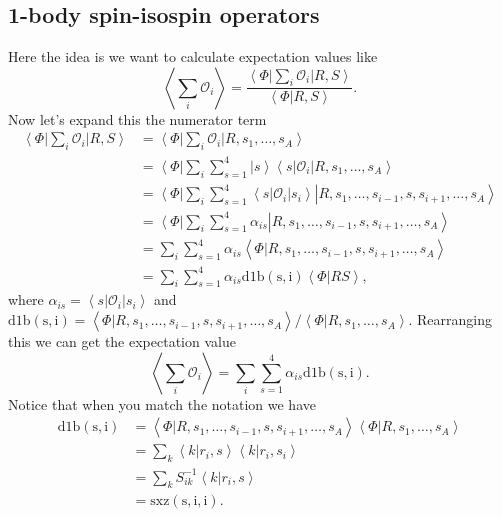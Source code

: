 \documentclass[12pt]{extarticle}
\newcommand{\Oi}{\mathcal{O}_{i}}
\newcommand{\ket}[1]{\left| #1 \right>}
\newcommand{\bra}[1]{\left< #1 \right|}
\newcommand{\braket}[2]{\left< #1 | #2 \right>}
\newcommand{\ketbra}[2]{\left| #1 \right> \left< #2 \right|}
\newcommand{\mycolor}[1]{\textit{\textcolor{red}{#1}}}
\newcommand{\longsi}{s_1, \ldots, s_{i-1} , s, s_{i+1}, \ldots, s_A}
\begin{document}
\subsection{1-body spin-isospin operators}
Here the idea is we want to calculate expectation values like
\begin{equation}
 \left< \sum_i \Oi \right> = \frac{\bra{\Phi} \sum\limits_i \Oi \ket{R,S}}{\braket{\Phi}{R,S}}.
\end{equation}
Now let's expand this the numerator term
\begin{align}
  \bra{\Phi} \sum_i \Oi \ket{R,S} &= \bra{\Phi} \sum_i \Oi \ket{R,s_1,\ldots,s_A} \\
  &= \bra{\Phi} \sum_i\sum_{s=1}^4	\ketbra{s}{s} \Oi \ket{R,s_1,\ldots,s_A} \\
  &= \bra{\Phi} \sum_i\sum_{s=1}^4	\bra{s}\Oi\ket{s_i} \ket{R,\longsi} \\
  &= \bra{\Phi} \sum_i\sum_{s=1}^4 \alpha_{is} \ket{R,\longsi} \\
  &= \sum_i\sum_{s=1}^4 \alpha_{is} \braket{\Phi}{R,\longsi} \\
  &= \sum_i\sum_{s=1}^4 \alpha_{is} \mathrm{d1b(s,i)} \braket{\Phi}{RS},
\end{align}
where $\alpha_{is} = \bra{s} \Oi \ket{s_i}$ and $\mathrm{d1b(s,i)} = \braket{\Phi}{R,\longsi}/\braket{\Phi}{R,s_1,\ldots,s_A}$. Rearranging this we can get the expectation value
\begin{equation}
  \left< \sum_i \Oi \right> = \sum_i \sum_{s=1}^4 \alpha_{is}\mathrm{d1b(s,i)}.
\end{equation}
Notice that when you match the notation we have
\begin{align}
  \mathrm{d1b(s,i)} &= \braket{\Phi}{R,\longsi} \braket{\Phi}{R,s_1,\ldots,s_A} \\
  &= \sum_k \braket{k}{r_i,s} \braket{k}{r_i,s_i} \\
  &= \sum_k S^{-1}_{ik} \braket{k}{r_i,s} \\
  &= \mathrm{sxz(s,i,i)}.
\end{align}
\end{document}
